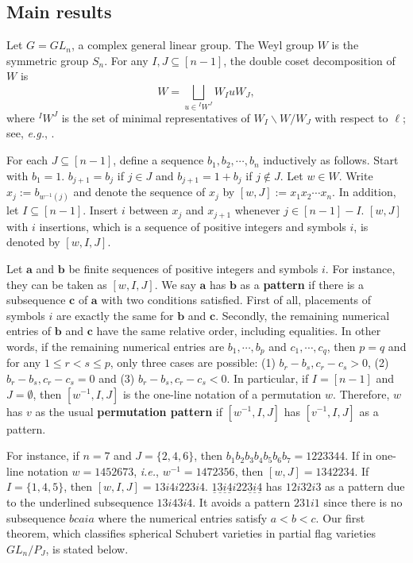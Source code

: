\documentclass[12pt]{amsart}
\theoremstyle{definition}
\theoremstyle{remark}
\begin{document}
\subsection{Main results} 

Let $G = GL_n$, a complex general linear group. The Weyl group $W$ is the symmetric group $S_n$. For any $I , J \subseteq [n-1]$, the double coset decomposition of $W$ is
\begin{equation}
W = \bigsqcup_{u \in {}^I W^J} W_I u W_J,
\end{equation}
where ${}^I W^J$ is the set of minimal representatives of $W_I \backslash W / W_J$ with respect to $\ell$; see, \textit{e.g.}, \cite[\S 1]{MR2120109}.

For each $J \subseteq [n-1]$, define a sequence $b_1 , b_2 ,  \cdots , b_n$ inductively as follows. Start with $b_1 = 1$. $b_{j+1} = b_j$ if $j \in J$ and $b_{j+1} = 1+b_j$ if $j \notin J$. Let $w \in W$. Write $x_{j} := b_{w^{-1}(j)}$ and denote the sequence of $x_j$ by $[w,J] := x_1 x_2 \cdots x_n$. In addition, let $I \subseteq [n-1]$. Insert $i$ between $x_j$ and $x_{j+1}$ whenever $j \in [n-1]-I$. $[w,J]$ with $i$ insertions, which is a sequence of positive integers and symbols $i$, is denoted by $[w,I,J]$.

Let $\mathbf{a}$ and $\mathbf{b}$ be finite sequences of positive integers and symbols $i$. For instance, they can be taken as $[w,I,J]$. We say $\mathbf{a}$ has $\mathbf{b}$ as a \textbf{pattern} if there is a subsequence $\mathbf{c}$ of $\mathbf{a}$ with two conditions satisfied. First of all, placements of symbols $i$ are exactly the same for $\mathbf{b}$ and $\mathbf{c}$. Secondly, the remaining numerical entries of $\mathbf{b}$ and $\mathbf{c}$ have the same relative order, including equalities. In other words, if the remaining numerical entries are $b_1, \cdots , b_p$ and $c_1 , \cdots , c_q$, then $p= q$ and for any $1 \leq r < s \leq p$, only three cases are possible: (1) $b_r - b_s , c_r - c_s >0$, (2) $b_r - b_s , c_r - c_s =0$ and (3) $b_r - b_s , c_r - c_s <0$. In particular, if $I = [n-1]$ and $J = \emptyset$, then $[w^{-1},I,J]$ is the one-line notation of a permutation $w$. Therefore, $w$ has $v$ as the usual \textbf{permutation pattern} if $[w^{-1} , I , J]$ has $[v^{-1} , I , J]$ as a pattern.

For instance, if  $n=7$ and $J=\{ 2,4,6\}$, then $b_1b_2 b_3 b_4 b_5 b_6 b_7 = 1223344$. If in one-line notation $w = 1452673$, \textit{i.e.}, $w^{-1} = 1472356$, then $[w,J] = 1342234$. If $I= \{ 1,4,5\}$, then $[w,I,J] = 13i4i223i4$. $\underline{1}\underline{3}\underline{i}\underline{4}i22\underline{3}\underline{i}\underline{4}$ has $12i32i3$ as a pattern due to the underlined subsequence $13i43i4$. It avoids a pattern $231i1$ since there is no subsequence $bcaia$ where the numerical entries satisfy $a < b< c$. Our first theorem, which classifies spherical Schubert varieties in partial flag varieties $GL_n/P_J$, is stated below.
\end{document}
